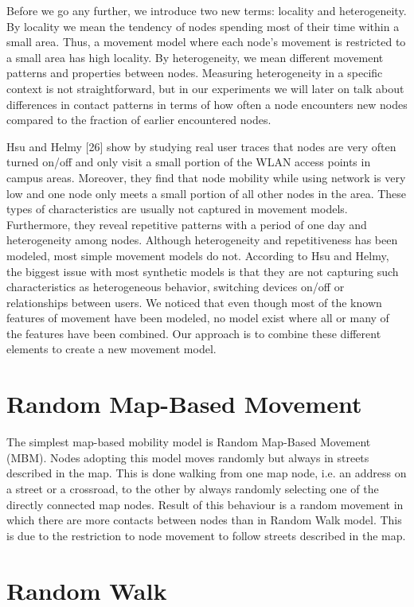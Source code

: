 Before we go any further, we introduce two new terms: locality and heterogeneity. By
locality we mean the tendency of nodes spending most of their time within a small area.
Thus, a movement model where each node's movement is restricted to a small area has
high locality. By heterogeneity, we mean different movement patterns and properties
between nodes. Measuring heterogeneity in a specific context is not straightforward,
but in our experiments we will later on talk about differences in contact patterns in
terms of how often a node encounters new nodes compared to the fraction of earlier
encountered nodes.

Hsu and Helmy [26] show by studying real user traces that nodes are very often turned
on/off and only visit a small portion of the WLAN access points in campus areas.
Moreover, they find that node mobility while using network is very low and one node
only meets a small portion of all other nodes in the area. These types of characteristics
are usually not captured in movement models. Furthermore, they reveal repetitive
patterns with a period of one day and heterogeneity among nodes. Although
heterogeneity and repetitiveness has been modeled, most simple movement models do
not. According to Hsu and Helmy, the biggest issue with most synthetic models is that
they are not capturing such characteristics as heterogeneous behavior, switching
devices on/off or relationships between users.
We noticed that even though most of the known features of movement have been
modeled, no model exist where all or many of the features have been combined. Our
approach is to combine these different elements to create a new movement model.



\section{Random Map-Based Movement}
The simplest map-based mobility model is Random Map-Based Movement (MBM). Nodes adopting this model moves randomly but always in streets described in the map. This is done walking from one map node, i.e. an address on a street or a crossroad, to the other by always randomly selecting one of the directly connected map nodes. Result of this behaviour is a random movement in which there are more contacts between nodes than in Random Walk model. This is due to the restriction to node movement to follow streets described in the map.

\section{Random Walk}


